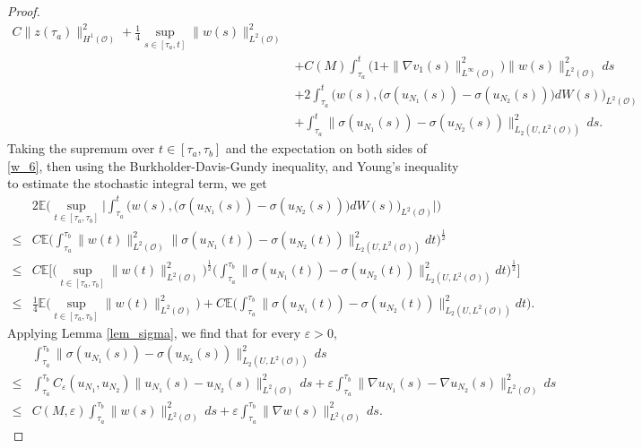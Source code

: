 \documentclass[reqno, 11pt]{amsart}
\theoremstyle{definition}
\numberwithin{equation}{section} \numberwithin{lem}{section}
\numberwithin{thm}{section} \numberwithin{prop}{section}
\numberwithin{cor}{section} \numberwithin{rem}{section}
\numberwithin{defn}{section}
\begin{document}
\begin{proof}
\begin{align}
C\|z(\tau_a)\|_{H^1(\mathcal O)}^2
+\frac{1}{4}\sup_{s\in[{\tau_a},t]}\|w(s)\|_{L^2(\mathcal {O})}^2\\ \nonumber&+C(M)\int_{\tau_a}^t\big(1+\|\nabla v_1(s)\|_{L^\infty(\mathcal {O})}^2\big)\| w(s)\|_{L^2(\mathcal {O})}^2\,ds\\ \nonumber&+2\int_{\tau_a}^t\big(w(s),\big(\sigma({u_{N_1}(s)})-\sigma({u_{N_2}(s)})\big)dW(s)\big)_{L^2(\mathcal {O})}\\&+\int_{\tau_a}^t
\big\|\sigma({u_{N_1}(s)})-\sigma({u_{N_2}(s)}) \big\|_{L_2(U,L^2(\mathcal O))}^2\,ds.
\end{align}
     Taking the supremum over $t\in[{\tau_a},{\tau_b}]$ and the expectation on both sides of \eqref{w_6}, then 
      using the
Burkholder-Davis-Gundy inequality, and Young's inequality to estimate the stochastic integral term, we get
\begin{align}\label{M_BDG}
    \nonumber &2\mathbb{E}\Big(\sup_{t\in[{\tau_a},{\tau_b}]}\Big|\int_{\tau_a}^{t}\big(w(s), \big(\sigma({u_{N_1}}(s))-\sigma({u_{N_2}(s)})\big)dW(s)\big)_{L^2(\mathcal {O})}\Big|\Big)\\\nonumber
\leq&C\mathbb{E}\Big(\int_{{\tau_a}}^{{\tau_b}}\|w(t)\|_{L^2(\mathcal {O})}^2\|\sigma({u_{N_1}}(t))-\sigma({u_{N_2}}(t))\|_{L_2(U,L^2(\mathcal {O}))}^2dt\Big)^\frac{1}{2}\\\nonumber
\leq&C\mathbb{E}\Big[\Big(\sup_{t\in[{\tau_a},{\tau_b}]}\|w(t)\|_{L^2(\mathcal {O})}^2\Big)^\frac{1}{2}\Big(\int_{{\tau_a}}^{{\tau_b}}\|\sigma ({u_{N_1}}(t))-\sigma ({u_{N_2}}(t))\|_{L_2(U,L^2(\mathcal {O}))}^2dt\Big)^\frac{1}{2}\Big]\\
    \leq&\frac{1}{4}\mathbb{E}\Big(\sup_{t\in[\tau_a,\tau_b]}\|w(t)\|_{L^2(\mathcal {O})}^2\Big)+C\mathbb{E}\Big(\int_{{\tau_a}}^{{\tau_b}}\|\sigma ({u_{N_1}}(t))-\sigma ({u_{N_2}}(t))\|_{L_2(U,L^2(\mathcal {O}))}^2dt\Big).
\end{align}
Applying Lemma \ref{lem_sigma}, we  find that for every $\varepsilon>0$,
\begin{align}\label{M_sigma}
    \nonumber&\int_{{\tau_a}}^{{\tau_b}}
\big\|\sigma({u_{N_1}(s)})-\sigma({u_{N_2}(s)}) \big\|_{L_2(U,L^2(\mathcal O))}^2\,ds\\\nonumber \le& \int_{{\tau_a}}^{{\tau_b}}C_\varepsilon({u_{N_1}},{u_{N_2}})\|{u_{N_1}(s)}-{u_{N_2}(s)}\|_{L^2(\mathcal O)}^2\,ds+\varepsilon\int_{{\tau_a}}^{{\tau_b}}\|\nabla{u_{N_1}(s)}-\nabla{u_{N_2}(s)}\|_{L^2(\mathcal O)}^2\,ds\\\le& C(M,\varepsilon)\int_{{\tau_a}}^{{\tau_b}}\|w(s)\|_{L^2(\mathcal O)}^2\,ds+\varepsilon\int_{{\tau_a}}^{{\tau_b}}\|\nabla w(s)\|_{L^2(\mathcal O)}^2\,ds.

\end{align}
\end{proof}
\end{document}
